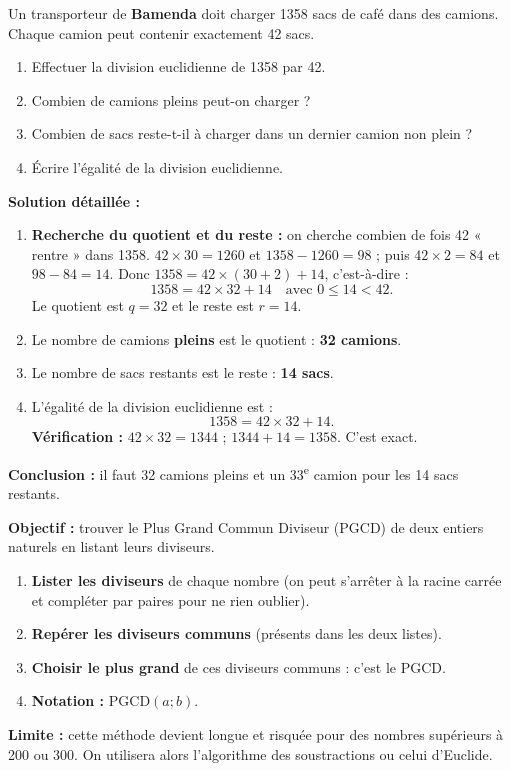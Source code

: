\documentclass[11pt]{article}
\begin{document}
\begin{exoresolu}
Un transporteur de \textbf{Bamenda} doit charger \num{1358} sacs de café dans des camions. Chaque camion peut contenir exactement \num{42} sacs.
\begin{enumerate}
    \item Effectuer la division euclidienne de \num{1358} par \num{42}.
    \item Combien de camions pleins peut-on charger ?
    \item Combien de sacs reste-t-il à charger dans un dernier camion non plein ?
    \item Écrire l'égalité de la division euclidienne.
\end{enumerate}
\tcblower
\textbf{Solution détaillée :}
\begin{enumerate}
    \item \textbf{Recherche du quotient et du reste :} on cherche combien de fois 42 « rentre » dans 1358.
    $42 \times 30 = 1260$ et $1358 - 1260 = 98$ ; puis $42 \times 2 = 84$ et $98 - 84 = 14$.
    Donc $1358 = 42 \times (30 + 2) + 14$, c'est-à-dire :
    \[ 1358 = 42 \times 32 + 14 \quad \text{avec } 0 \le 14 < 42. \]
    Le quotient est $q = 32$ et le reste est $r = 14$.
    \item Le nombre de camions \textbf{pleins} est le quotient : \textbf{32 camions}.
    \item Le nombre de sacs restants est le reste : \textbf{14 sacs}.
    \item L'égalité de la division euclidienne est :
    \[ 1358 = 42 \times 32 + 14. \]
    \textbf{Vérification :} $42 \times 32 = 1344$ ; $1344 + 14 = 1358$. C'est exact.
\end{enumerate}
\textbf{Conclusion :} il faut 32 camions pleins et un 33\textsuperscript{e} camion pour les 14 sacs restants.
\end{exoresolu}

\begin{methode}
\textbf{Objectif :} trouver le Plus Grand Commun Diviseur (PGCD) de deux entiers naturels en listant leurs diviseurs.
\begin{enumerate}
    \item \textbf{Lister les diviseurs} de chaque nombre (on peut s'arrêter à la racine carrée et compléter par paires pour ne rien oublier).
    \item \textbf{Repérer les diviseurs communs} (présents dans les deux listes).
    \item \textbf{Choisir le plus grand} de ces diviseurs communs : c'est le PGCD.
    \item \textbf{Notation :} $\text{PGCD}(a; b)$.
\end{enumerate}
\textbf{Limite :} cette méthode devient longue et risquée pour des nombres supérieurs à 200 ou 300. On utilisera alors l'algorithme des soustractions ou celui d'Euclide.
\end{methode}
\end{document}
